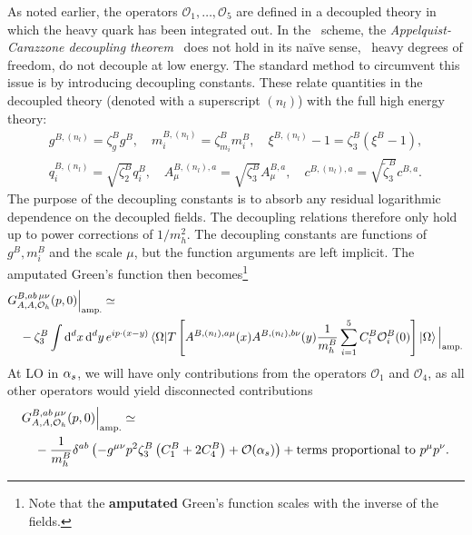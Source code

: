 As noted earlier, the operators $\mathcal{O}_1, \ldots , \mathcal{O}_5$ are defined in a decoupled theory in which the heavy quark has been integrated out. In the \MS\ scheme, the \textit{Appelquist-Carazzone decoupling theorem}~\cite{Appelquist:1974tg} does not hold in its na\"ive sense, \ie\ heavy degrees of freedom, do not decouple at low energy. The standard method to circumvent this issue is by introducing decoupling constants. These relate quantities in the decoupled theory (denoted with a superscript $(n_l)$) with the full high energy theory:
\begin{equation}
\begin{gathered}
g^{B, (n_l)} = \zeta_g^B g^{B}, \quad m_i^{B, (n_l)} = \zeta_{m_i}^B m_i^B, \quad \xi^{B,(n_l)} - 1 = \zeta_3^{B} (\xi^{B} - 1), \\
q_i^{B,(n_l)} = \sqrt{\zeta_2^B} q_i^{B}, \quad A_\mu^{B,(n_l),a} = \sqrt{\zeta_3^B} A^{B, a}_\mu, \quad c^{B,(n_l),a} = \sqrt{\tilde{\zeta}_3^B} c^{B,a}.
\end{gathered}
\label{eq:4:decoupling}
\end{equation}
The purpose of the decoupling constants is to absorb any residual logarithmic dependence on the decoupled fields. The decoupling relations therefore only hold up to power corrections of $1/m_h^2$. The decoupling constants are functions of $g^B, m_i^B$ and the scale $\mu$, but the function arguments are left implicit. The amputated Green's function then becomes\footnote{Note that the \textbf{amputated} Green's function scales with the inverse of the fields.}
\begin{equation}
\begin{split}
&G_{A,A,\mathcal{O}_h}^{B,ab\, \mu\nu} (p, 0) \Big \vert_{\text{amp.}} \simeq \\
&\quad- \zeta_3^B \int \mathrm{d}^d x\, \mathrm{d}^d y\, e^{ip\cdot (x - y)} \braket{\Omega| T \left[ A^{B,(n_l),a\mu}(x) A^{B, (n_l), b \nu}(y) \frac{1}{m_h^B} \sum_{i=1}^5 C_i^B \mathcal{O}_i^B(0) \right] |\Omega} \Big \vert_{\text{amp.}} \\
\end{split}
\end{equation}
At \acs{LO} in $\alpha_s$, we will have only contributions from the operators $\mathcal{O}_1$ and $\mathcal{O}_4$, as all other operators would yield disconnected contributions
\begin{equation}
\begin{split}
&G_{A,A,\mathcal{O}_h}^{B,ab\, \mu\nu} (p, 0) \Big \vert_{\text{amp.}}  \simeq \\
&\quad -\frac{1}{m_h^B}\delta^{ab} \left(-g^{\mu \nu} p^2 \zeta_3^B \left( C_1^B + 2 C_4^B \right) + \mathcal{O}\!\left(\alpha_s\right) \right) + \text{terms proportional to } p^\mu p^\nu .
\end{split}
\end{equation}
